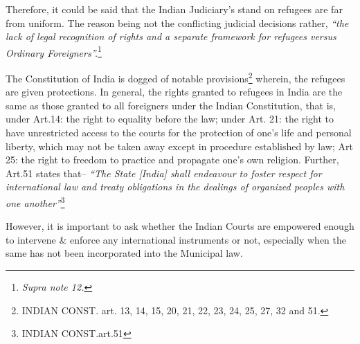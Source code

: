 \begin{multicols}{2}
\noi
Therefore, it could be said that the Indian Judiciary’s stand on refugees are far from uniform.
The reason being not the conflicting judicial decisions rather, \textit{“the lack of legal recognition of
rights and a separate framework for refugees versus Ordinary Foreigners”.}\footnote{\textit{Supra note 12.}}


\noi
The Constitution of India is dogged of notable provisions\footnote{INDIAN CONST. art. 13, 14, 15, 20, 21, 22, 23, 24, 25, 27, 32 and 51.} wherein, the refugees are given protections. In general, the rights granted to refugees in India are the same as those granted to
all foreigners under the Indian Constitution, that is, under Art.14: the right to equality before
the law; under Art. 21: the right to have unrestricted access to the courts for the protection of
one's life and personal liberty, which may not be taken away except in procedure established
by law; Art 25: the right to freedom to practice and propagate one’s own religion. Further,
Art.51 states that– \textit{“The State [India] shall endeavour to foster respect for international law
and treaty obligations in the dealings of organized peoples with one another”}\footnote{INDIAN CONST.art.51}

\noi
However, it is important to ask whether the Indian Courts are empowered enough to intervene
\& enforce any international instruments or not, especially when the same has not been
incorporated into the Municipal law.


\end{multicols}

